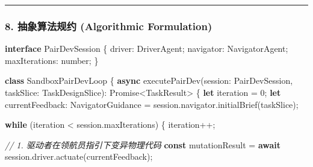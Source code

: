 \documentclass[
]{ctexart}
\newenvironment{Shaded}{}{}
\newcommand{\AttributeTok}[1]{\textcolor[rgb]{0.49,0.56,0.16}{#1}}
\newcommand{\BuiltInTok}[1]{\textcolor[rgb]{0.00,0.50,0.00}{#1}}
\newcommand{\CommentTok}[1]{\textcolor[rgb]{0.38,0.63,0.69}{\textit{#1}}}
\newcommand{\ControlFlowTok}[1]{\textcolor[rgb]{0.00,0.44,0.13}{\textbf{#1}}}
\newcommand{\DataTypeTok}[1]{\textcolor[rgb]{0.56,0.13,0.00}{#1}}
\newcommand{\DecValTok}[1]{\textcolor[rgb]{0.25,0.63,0.44}{#1}}
\newcommand{\FunctionTok}[1]{\textcolor[rgb]{0.02,0.16,0.49}{#1}}
\newcommand{\KeywordTok}[1]{\textcolor[rgb]{0.00,0.44,0.13}{\textbf{#1}}}
\newcommand{\NormalTok}[1]{#1}
\newcommand{\OperatorTok}[1]{\textcolor[rgb]{0.40,0.40,0.40}{#1}}
\renewcommand{\_}{\discretionary{}{}{\textunderscore}}
\begin{document}
\begin{center}\rule{0.5\linewidth}{0.5pt}\end{center}

\subsubsection{8. 抽象算法规约 (Algorithmic
Formulation)}\label{ux62bdux8c61ux7b97ux6cd5ux89c4ux7ea6-algorithmic-formulation-5}

\begin{Shaded}
\begin{Highlighting}[]
\KeywordTok{interface}\NormalTok{ PairDevSession \{}
\NormalTok{  driver}\OperatorTok{:}\NormalTok{ DriverAgent}\OperatorTok{;}
\NormalTok{  navigator}\OperatorTok{:}\NormalTok{ NavigatorAgent}\OperatorTok{;}
\NormalTok{  maxIterations}\OperatorTok{:} \DataTypeTok{number}\OperatorTok{;}
\NormalTok{\}}

\KeywordTok{class}\NormalTok{ SandboxPairDevLoop \{}
  \KeywordTok{async} \FunctionTok{executePairDev}\NormalTok{(session}\OperatorTok{:}\NormalTok{ PairDevSession}\OperatorTok{,}\NormalTok{ taskSlice}\OperatorTok{:}\NormalTok{ TaskDesignSlice)}\OperatorTok{:} \BuiltInTok{Promise}\OperatorTok{\textless{}}\NormalTok{TaskResult}\OperatorTok{\textgreater{}}\NormalTok{ \{}
    \KeywordTok{let}\NormalTok{ iteration }\OperatorTok{=} \DecValTok{0}\OperatorTok{;}
    \KeywordTok{let}\NormalTok{ currentFeedback}\OperatorTok{:}\NormalTok{ NavigatorGuidance }\OperatorTok{=}\NormalTok{ session}\OperatorTok{.}\AttributeTok{navigator}\OperatorTok{.}\FunctionTok{initialBrief}\NormalTok{(taskSlice)}\OperatorTok{;}

    \ControlFlowTok{while}\NormalTok{ (iteration }\OperatorTok{\textless{}}\NormalTok{ session}\OperatorTok{.}\AttributeTok{maxIterations}\NormalTok{) \{}
\NormalTok{      iteration}\OperatorTok{++;}
      
      \CommentTok{// 1. 驱动者在领航员指引下变异物理代码}
      \KeywordTok{const}\NormalTok{ mutationResult }\OperatorTok{=} \ControlFlowTok{await}\NormalTok{ session}\OperatorTok{.}\AttributeTok{driver}\OperatorTok{.}\FunctionTok{actuate}\NormalTok{(currentFeedback)}\OperatorTok{;}
      

\end{Highlighting}
\end{Shaded}
\end{document}
